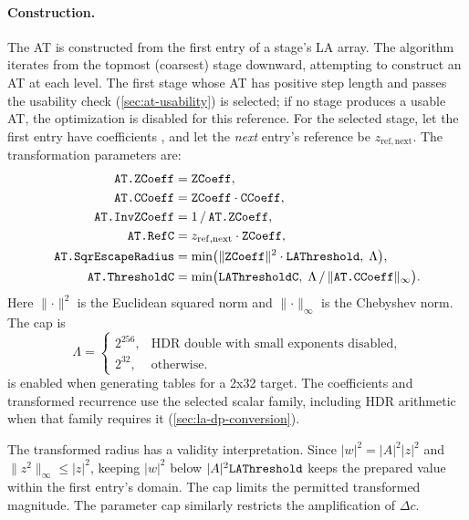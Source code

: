 \paragraph{Construction.}
The AT is constructed from the first entry of a stage's LA array.
The algorithm iterates from the topmost (coarsest) stage downward,
attempting to construct an AT at each level.  The first stage whose
AT has positive step length and passes the usability check
(\cref{sec:at-usability}) is
selected; if no stage produces a usable AT, the optimization is
disabled for this reference.  For the selected stage, let the first
entry have coefficients ,  and let the
\emph{next} entry's reference be \(z_\mathrm{ref,next}\).  The
transformation parameters are:
\begin{align}
\texttt{AT.ZCoeff}   &= \texttt{ZCoeff}, \\
\texttt{AT.CCoeff}   &= \texttt{ZCoeff} \cdot \texttt{CCoeff}, \\
\texttt{AT.InvZCoeff}&= 1 \,/\, \texttt{AT.ZCoeff}, \\
\texttt{AT.RefC}     &= z_\mathrm{ref,next} \cdot \texttt{ZCoeff}, \\
\texttt{AT.SqrEscapeRadius} &= \min\bigl(
      \lVert\texttt{ZCoeff}\rVert^2 \cdot \texttt{LAThreshold},\;
      \Lambda\bigr), \\
\texttt{AT.ThresholdC} &= \min\bigl(
      \texttt{LAThresholdC},\;
      \Lambda \,/\, \lVert\texttt{AT.CCoeff}\rVert_\infty\bigr).
\end{align}
Here $\lVert\cdot\rVert^2$ is the Euclidean squared norm and
$\lVert\cdot\rVert_\infty$ is the Chebyshev norm. The cap is
\[
\Lambda=\begin{cases}
2^{256}, & \text{HDR double with small exponents disabled},\\
2^{32}, & \text{otherwise}.
\end{cases}
\]
 is enabled when generating tables for a
2x32 target. The coefficients and transformed recurrence use the
selected scalar family, including HDR arithmetic when that family
requires it (\cref{sec:la-dp-conversion}).

The transformed radius has a validity interpretation. Since
$|w|^2=|A|^2|z|^2$ and
$\lVert z^2\rVert_\infty\le|z|^2$, keeping $|w|^2$ below
$|A|^2\texttt{LAThreshold}$ keeps the prepared value within the first
entry's domain. The cap limits the permitted transformed magnitude.
The parameter cap similarly restricts the amplification of $\Delta c$.

